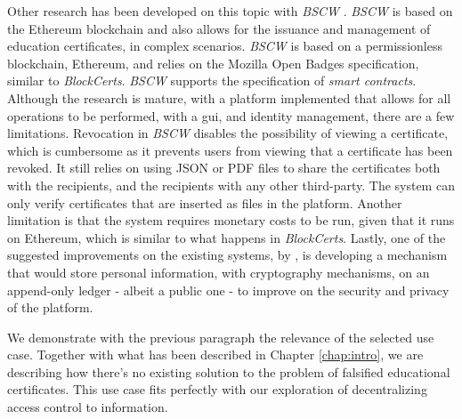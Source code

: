 Other research has been developed on this topic with \emph{BSCW} \cite{grather_blockchain_2018}. \emph{BSCW} is based on the Ethereum blockchain and also allows for the issuance and management of education certificates, in complex scenarios. \emph{BSCW} is based on a permissionless blockchain, Ethereum, and relies on the Mozilla Open Badges specification, similar to \emph{BlockCerts}. \emph{BSCW} supports the specification of \emph{smart contracts}. Although the research is mature, with a platform implemented that allows for all operations to be performed, with a \gls{gui}, and identity management, there are a few limitations. Revocation in \emph{BSCW} disables the possibility of viewing a certificate, which is cumbersome as it prevents users from viewing that a certificate has been revoked. It still relies on using JSON or PDF files to share the certificates both with the recipients, and the recipients with any other third-party. The system can only verify certificates that are inserted as files in the platform. Another limitation is that the system requires monetary costs to be run, given that it runs on Ethereum, which is similar to what happens in \emph{BlockCerts}. Lastly, one of the suggested improvements on the existing systems, by \cite{grather_blockchain_2018} \cite{grather_blockchain_2018}, is developing a mechanism that would store personal information, with cryptography mechanisms, on an append-only ledger - albeit a public one - to improve on the security and privacy of the platform.

We demonstrate with the previous paragraph the relevance of the selected use case. Together with what has been described in Chapter \ref{chap:intro}, we are describing how there's no existing solution to the problem of falsified educational certificates. This use case fits perfectly with our exploration of decentralizing access control to information.